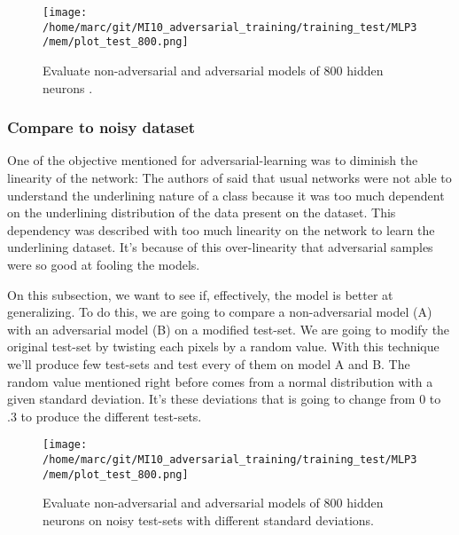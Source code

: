 			\begin{figure}
				\centering
				\texttt{[image: /home/marc/git/MI10\_adversarial\_training/training\_test/MLP3/mem/plot\_test\_800.png]}
				\caption{Evaluate non-adversarial and adversarial models of 800 hidden neurons .}
				\label{fig:mnist_neurons}
			\end{figure}


		\subsubsection{Compare to noisy dataset} 
		\label{ssub:compare_to_noisy_dataset}
			One of the objective mentioned for adversarial-learning was to diminish the linearity of the network: The authors of \cite{goodfellow2014explaining} said that usual networks were not able to understand the underlining nature of a class because it was too much dependent on the underlining distribution of the data present on the dataset. This dependency was described with too much linearity on the network to learn the underlining dataset. It's because of this over-linearity that adversarial samples were so good at fooling the models.

			On this subsection, we want to see if, effectively, the model is better at generalizing. To do this, we are going to compare a non-adversarial model (A) with an adversarial model (B) on a modified test-set. We are going to modify the original test-set by twisting each pixels by a random value. With this technique we'll produce few test-sets and test every of them on model A and B. The random value mentioned right before comes from a normal distribution with a given standard deviation. It's these deviations that is going to change from $0$ to $.3$ to produce the different test-sets.
			
			\begin{figure}
				\centering
				\texttt{[image: /home/marc/git/MI10\_adversarial\_training/training\_test/MLP3/mem/plot\_test\_800.png]}
				\caption{Evaluate non-adversarial and adversarial models of 800 hidden neurons on noisy test-sets with different standard deviations.}
				\label{fig:mnist_neurons}
			\end{figure}



